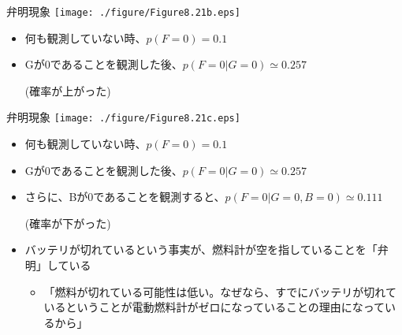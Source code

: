 \begin{frame}{弁明現象}
 \texttt{[image: ./figure/Figure8.21b.eps]}
 \begin{itemize}
  \item 何も観測していない時、$p(F=0)= 0.1$
  \item Gが0であることを観測した後、$p(F=0|G=0)\simeq 0.257$

        (\alert{確率が上がった})
 \end{itemize}
\end{frame}

\begin{frame}{弁明現象}
 \texttt{[image: ./figure/Figure8.21c.eps]}
 \begin{itemize}
  \item 何も観測していない時、$p(F=0)= 0.1$
  \item Gが0であることを観測した後、$p(F=0|G=0)\simeq 0.257$
  \item さらに、Bが0であることを観測すると、$p(F=0|G=0, B=0)\simeq 0.111$

        (\alert{確率が下がった})
  \item バッテリが切れているという事実が、燃料計が空を指していることを「弁明」している
        \begin{itemize}
         \item 「燃料が切れている可能性は低い。なぜなら、すでにバッテリが切れているということが電動燃料計がゼロになっていることの理由になっているから」
        \end{itemize}
 \end{itemize}
\end{frame}


